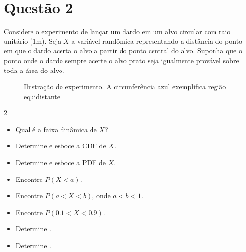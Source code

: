 \section{Questão 2}
Considere o experimento de lançar um dardo em um alvo circular com raio unitário (1m). 
Seja $X$ a variável randômica representando a distância do ponto em que o dardo acerta o alvo a partir do ponto central do alvo. 
Suponha que o ponto onde o dardo sempre acerte o alvo prato seja igualmente provável sobre toda a área do alvo.
%
\begin{figure}[h!]
    \centering
    \caption{Ilustração do experimento. A circunferência azul exemplifica região equidistante.}
\end{figure}

\begin{multicols}{2}
\begin{itemize}
    \item [a)] 
    Qual é a faixa dinâmica de $X$?
    
    \item [b)] 
    Determine e esboce a CDF de $X$.
    
    \item [c)] 
    Determine e esboce a PDF de $X$.
    
    \item [d)] 
    Encontre $P (X < a)$.
    
    \item [e)] 
    Encontre $P(a < X < b)$, onde $a < b < 1$.
    
    \item [f)] 
    Encontre $P(0.1 < X < 0.9)$.
    
    \item [g)] 
    Determine .
    
    \item [h)] 
    Determine .
\end{itemize}
\end{multicols}


